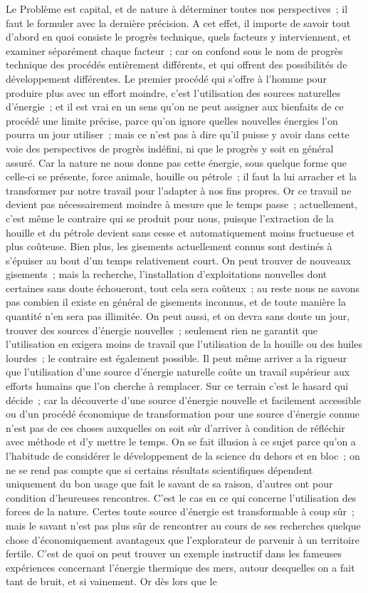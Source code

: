 \documentclass[french,twoside]{book} %
\begin{document}
Le Problème est capital, et de nature à déterminer toutes nos perspectives ; il faut le formuler avec la dernière précision. A cet effet, il importe de savoir tout d'abord en quoi consiste le progrès technique, quels facteurs y interviennent, et examiner séparément chaque facteur ; car on confond sous le nom de progrès technique des procédés entièrement différents, et qui offrent des possibilités de développement différentes. Le premier procédé qui s'offre à l'homme pour produire plus avec un effort moindre, c'est l'utilisation des sources naturelles d'énergie ; et il est vrai en un sens qu'on ne peut assigner aux bienfaits de ce procédé une limite précise, parce qu'on ignore quelles nouvelles énergies l'on pourra un jour utiliser ; mais ce n'est pas à dire qu'il puisse y avoir dans cette voie des perspectives de progrès indéfini, ni que le progrès y soit en général assuré. Car la nature ne nous donne pas cette énergie, sous quelque forme que celle-ci se présente, force animale, houille ou pétrole ; il faut la lui arracher et la transformer par notre travail pour l'adapter à nos fins propres. Or ce travail ne devient pas nécessairement moindre à mesure que le temps passe ; actuellement, c'est même le contraire qui se produit pour nous, puisque l'extraction de la houille et du pétrole devient sans cesse et automatiquement moins fructueuse et plus coûteuse. Bien plus, les gisements actuellement connus sont destinés à s'épuiser au bout d'un temps relativement court. On peut trouver de nouveaux gisements ; mais la recherche, l'installation d'exploitations nouvelles dont certaines sans doute échoueront, tout cela sera coûteux ; au reste nous ne savons pas combien il existe en général de gisements inconnus, et de toute manière la quantité n'en sera pas illimitée. On peut aussi, et on devra sans doute un jour, trouver des sources d'énergie nouvelles ; seulement rien ne garantit que l'utilisation en exigera moins de travail que l'utilisation de la houille ou des huiles lourdes ; le contraire est également possible. Il peut même arriver a la rigueur que l'utilisation d'une source d'énergie naturelle coûte un travail supérieur aux efforts humains que l'on cherche à remplacer. Sur ce terrain c'est le hasard qui décide ; car la découverte d'une source d'énergie nouvelle et facilement accessible ou d'un procédé économique de transformation pour une source d'énergie connue n'est pas de ces choses auxquelles on soit sûr d'arriver à condition de réfléchir avec méthode et d'y mettre le temps. On se fait illusion à ce sujet parce qu'on a l'habitude de considérer le développement de la science du dehors et en bloc ; on ne se rend pas compte que si certains résultats scientifiques dépendent uniquement du bon usage que fait le savant de sa raison, d'autres ont pour condition d'heureuses rencontres. C'est le cas en ce qui concerne l'utilisation des forces de la nature. Certes toute source d'énergie est transformable à coup sûr ; mais le savant n'est pas plus sûr de rencontrer au cours de ses recherches quelque chose d'économiquement avantageux que l'explorateur de parvenir à un territoire fertile. C'est de quoi on peut trouver un exemple instructif dans les fameuses expériences concernant l'énergie thermique des mers, autour desquelles on a fait tant de bruit, et si vainement. Or dès lors que le 
\end{document}
